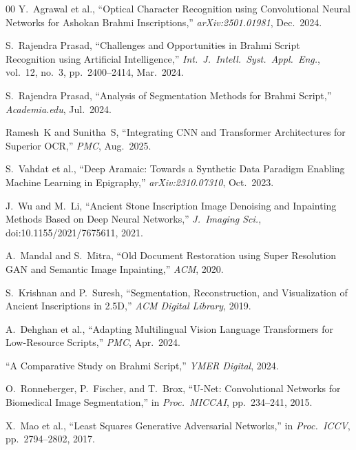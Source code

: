 \documentclass[conference]{IEEEtran}
\begin{document}
\begin{thebibliography}{00}
Y.~Agrawal et al., ``Optical Character Recognition using Convolutional Neural Networks for Ashokan Brahmi Inscriptions,'' \textit{arXiv:2501.01981}, Dec.\ 2024.

S.~Rajendra Prasad, ``Challenges and Opportunities in Brahmi Script Recognition using Artificial Intelligence,'' \textit{Int.\ J.\ Intell.\ Syst.\ Appl.\ Eng.}, vol.~12, no.~3, pp.~2400--2414, Mar.\ 2024.

S.~Rajendra Prasad, ``Analysis of Segmentation Methods for Brahmi Script,'' \textit{Academia.edu}, Jul.\ 2024.

Ramesh~K and Sunitha~S, ``Integrating CNN and Transformer Architectures for Superior OCR,'' \textit{PMC}, Aug.\ 2025.

S.~Vahdat et al., ``Deep Aramaic: Towards a Synthetic Data Paradigm Enabling Machine Learning in Epigraphy,'' \textit{arXiv:2310.07310}, Oct.\ 2023.

J.~Wu and M.~Li, ``Ancient Stone Inscription Image Denoising and Inpainting Methods Based on Deep Neural Networks,'' \textit{J.\ Imaging Sci.}, doi:10.1155/2021/7675611, 2021.

A.~Mandal and S.~Mitra, ``Old Document Restoration using Super Resolution GAN and Semantic Image Inpainting,'' \textit{ACM}, 2020.

S.~Krishnan and P.~Suresh, ``Segmentation, Reconstruction, and Visualization of Ancient Inscriptions in 2.5D,'' \textit{ACM Digital Library}, 2019.

A.~Dehghan et al., ``Adapting Multilingual Vision Language Transformers for Low-Resource Scripts,'' \textit{PMC}, Apr.\ 2024.

``A Comparative Study on Brahmi Script,'' \textit{YMER Digital}, 2024.

O.~Ronneberger, P.~Fischer, and T.~Brox, ``U-Net: Convolutional Networks for Biomedical Image Segmentation,'' in \textit{Proc.\ MICCAI}, pp.~234--241, 2015.

X.~Mao et al., ``Least Squares Generative Adversarial Networks,'' in \textit{Proc.\ ICCV}, pp.~2794--2802, 2017.
\end{thebibliography}
\end{document}
